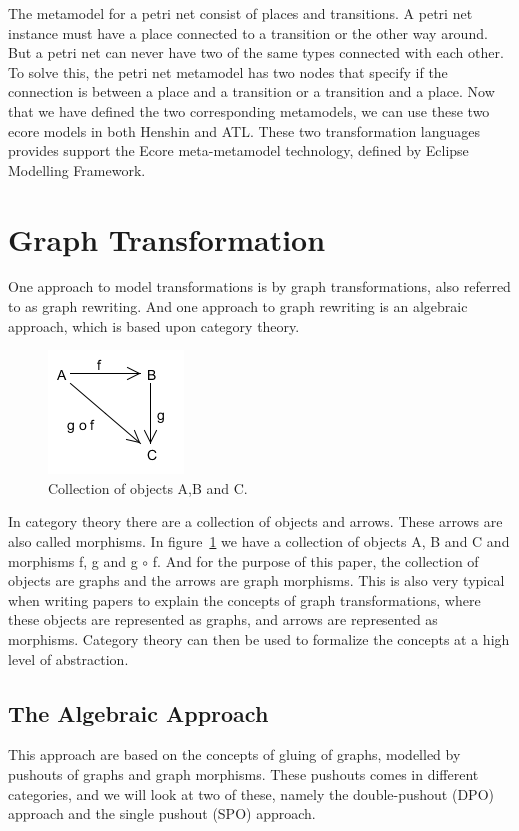 \documentclass[pdftex,11pt,a4paper]{article}
\begin{document}
The metamodel for a petri net consist of places and transitions. A petri net
instance must have a place connected to a transition or the other way around.
But a petri net can never have two of the same types connected with each other.
To solve this, the petri net metamodel has two nodes that specify if the
connection is between a place and a transition or a transition and a place.
\indent Now that we have defined the two corresponding metamodels, we can use
these two ecore models in both Henshin and ATL. These two transformation
languages provides support the Ecore meta-metamodel technology, defined by
Eclipse Modelling Framework. 

\section{Graph Transformation}
\noindent One approach to model transformations is by graph transformations,
also referred to as graph rewriting. And one approach to graph rewriting is an
algebraic approach, which is based upon category theory\cite{Barr1990}.

\begin{figure}[H]
	\centering
	\includegraphics[scale=0.7]{figures/categoryTheory.png}
	\caption{Collection of objects A,B and C.}
	\label{fig:categoryTheory}
\end{figure}


In category theory there are a collection of objects and arrows. These arrows
are also called morphisms. In figure~\ref{fig:categoryTheory} we have a
collection of objects A, B and C and morphisms f, g and g $\circ$ f. And for the
purpose of this paper, the collection of objects are graphs and the arrows are
graph morphisms. This is also very typical when writing papers to explain the
concepts of graph transformations, where these objects are represented as
graphs, and arrows are represented as morphisms. Category theory can then be
used to formalize the concepts at a high level of abstraction.

\subsection{The Algebraic Approach}
\noindent This approach are based on the concepts of gluing of graphs, modelled
by pushouts of graphs and graph morphisms. These pushouts comes in different
categories, and we will look at two of these, namely the double-pushout (DPO)
approach and the single pushout (SPO) approach\cite{Loewe1997,Ehrig1997}.
\end{document}
